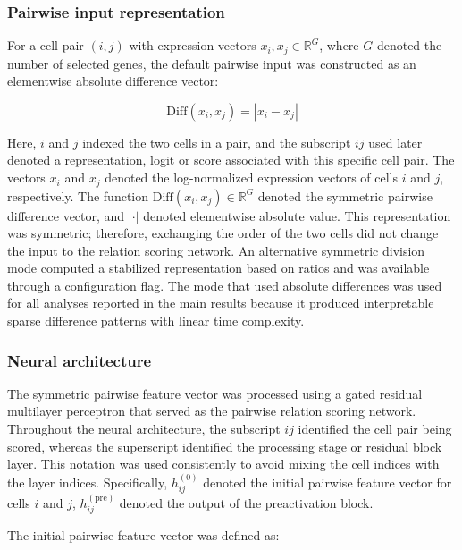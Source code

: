 \documentclass[11pt]{article}
\begin{document}
\subsubsection*{Pairwise input representation}

For a cell pair $(i,j)$ with expression vectors $x_i,x_j\in\mathbb{R}^{G}$, where $G$ denoted the number of selected genes, the default pairwise input was constructed as an elementwise absolute difference vector:

\begin{equation}
\mathrm{Diff}(x_i,x_j)=|x_i-x_j|
  \label{eq:diff}
\end{equation}

Here, $i$ and $j$ indexed the two cells in a pair, and the subscript $ij$ used later denoted a representation, logit or score associated with this specific cell pair. The vectors $x_i$ and $x_j$ denoted the log-normalized expression vectors of cells $i$ and $j$, respectively. The function $\mathrm{Diff}(x_i,x_j)\in\mathbb{R}^{G}$ denoted the symmetric pairwise difference vector, and $|\cdot|$ denoted elementwise absolute value. This representation was symmetric; therefore, exchanging the order of the two cells did not change the input to the relation scoring network. An alternative symmetric division mode computed a stabilized representation based on ratios and was available through a configuration flag. The mode that used absolute differences was used for all analyses reported in the main results because it produced interpretable sparse difference patterns with linear time complexity.

\subsubsection*{Neural architecture}

The symmetric pairwise feature vector was processed using a gated residual multilayer perceptron that served as the pairwise relation scoring network. Throughout the neural architecture, the subscript $ij$ identified the cell pair being scored, whereas the superscript identified the processing stage or residual block layer. This notation was used consistently to avoid mixing the cell indices with the layer indices. Specifically, $h_{ij}^{(0)}$ denoted the initial pairwise feature vector for cells $i$ and $j$, $h_{ij}^{(\mathrm{pre})}$ denoted the output of the preactivation block.

The initial pairwise feature vector was defined as:
\end{document}
